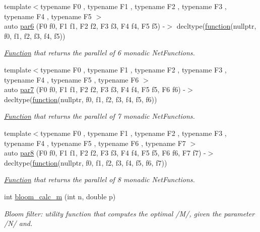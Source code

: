 \begin{DoxyCompactItemize}
{\footnotesize template$<$typename F0 , typename F1 , typename F2 , typename F3 , typename F4 , typename F5 $>$ }\\auto \hyperlink{namespacepfq_1_1lang_1_1anonymous__namespace_02default_8hpp_03_adb58911b28e6abe608123dbf933146ed}{par6} (F0 f0, F1 f1, F2 f2, F3 f3, F4 f4, F5 f5) -\/$>$ decltype(\hyperlink{namespacepfq_1_1lang_a1a4638059d700ae08d0ca63886ff2bb3}{function}(nullptr, f0, f1, f2, f3, f4, f5))
\begin{DoxyCompactList}\small\item\em \hyperlink{structpfq_1_1lang_1_1Function}{Function} that returns the parallel of 6 monadic Net\+Functions. \end{DoxyCompactList}\item 
{\footnotesize template$<$typename F0 , typename F1 , typename F2 , typename F3 , typename F4 , typename F5 , typename F6 $>$ }\\auto \hyperlink{namespacepfq_1_1lang_1_1anonymous__namespace_02default_8hpp_03_a0dfd1f474b684ccae730fc9ecf182c91}{par7} (F0 f0, F1 f1, F2 f2, F3 f3, F4 f4, F5 f5, F6 f6) -\/$>$ decltype(\hyperlink{namespacepfq_1_1lang_a1a4638059d700ae08d0ca63886ff2bb3}{function}(nullptr, f0, f1, f2, f3, f4, f5, f6))
\begin{DoxyCompactList}\small\item\em \hyperlink{structpfq_1_1lang_1_1Function}{Function} that returns the parallel of 7 monadic Net\+Functions. \end{DoxyCompactList}\item 
{\footnotesize template$<$typename F0 , typename F1 , typename F2 , typename F3 , typename F4 , typename F5 , typename F6 , typename F7 $>$ }\\auto \hyperlink{namespacepfq_1_1lang_1_1anonymous__namespace_02default_8hpp_03_abea4fd8a8c302e06a480d19d3e9b1165}{par8} (F0 f0, F1 f1, F2 f2, F3 f3, F4 f4, F5 f5, F6 f6, F7 f7) -\/$>$ decltype(\hyperlink{namespacepfq_1_1lang_a1a4638059d700ae08d0ca63886ff2bb3}{function}(nullptr, f0, f1, f2, f3, f4, f5, f6, f7))
\begin{DoxyCompactList}\small\item\em \hyperlink{structpfq_1_1lang_1_1Function}{Function} that returns the parallel of 8 monadic Net\+Functions. \end{DoxyCompactList}\item 
int \hyperlink{namespacepfq_1_1lang_1_1anonymous__namespace_02default_8hpp_03_a69262c3acb476a85eb29e16540ae3f08}{bloom\+\_\+calc\+\_\+m} (int n, double p)
\begin{DoxyCompactList}\small\item\em Bloom filter\+: utility function that computes the optimal /\+M/, given the parameter /\+N/ and. \end{DoxyCompactList}\item 

\end{DoxyCompactItemize}
